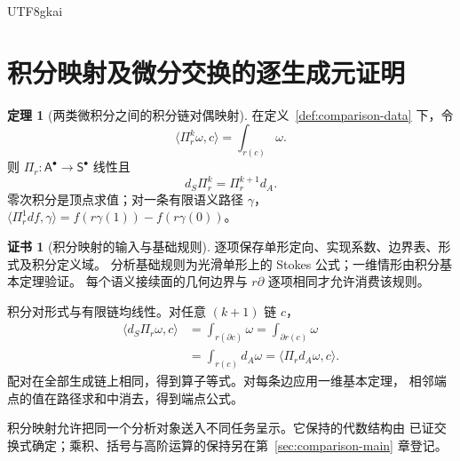\documentclass[12pt]{report}
\makeatletter
\theoremstyle{definition}
\newtheorem{theorem}{定理}[chapter]
\newtheorem{Certificate}{证书}[chapter]
\renewenvironment{proof}[1][\proofname]{\par
  \pushQED{\qed}\normalfont
  \topsep6\p@\@plus6\p@\relax
  \trivlist
  \item[\hskip\labelsep\normalfont #1\@addpunct{.}]\ignorespaces
}{
  \popQED\endtrivlist\@endpefalse
}
\makeatother
\begin{document}
\begin{CJK*}{UTF8}{gkai}
\section{积分映射及微分交换的逐生成元证明}
\begin{theorem}[两类微积分之间的积分链对偶映射]
\label{thm:comparison-integration}
在定义~\ref{def:comparison-data} 下，令
\[
\langle\Pi_r^k\omega,c\rangle=\int_{r(c)}\omega.
\]
则 \(\Pi_r:\mathsf A^\bullet\to\mathsf S^\bullet\) 线性且
\[
d_S\Pi_r^k=\Pi_r^{k+1}d_A.
\]
零次积分是顶点求值；对一条有限语义路径 \(\gamma\)，
\(\langle\Pi_r^1df,\gamma\rangle=f(r\gamma(1))-f(r\gamma(0))\)。
\end{theorem}
\begin{Certificate}[积分映射的输入与基础规则]
逐项保存单形定向、实现系数、边界表、形式及积分定义域。
分析基础规则为光滑单形上的 Stokes 公式；一维情形由积分基本定理验证。
每个语义接续面的几何边界与 \(r\partial\) 逐项相同才允许消费该规则。
\end{Certificate}
\begin{proof}
积分对形式与有限链均线性。对任意 \((k+1)\) 链 \(c\)，
\[
\begin{aligned}
\langle d_S\Pi_r\omega,c\rangle
&=\int_{r(\partial c)}\omega
=\int_{\partial r(c)}\omega\\
&=\int_{r(c)}d_A\omega
=\langle\Pi_r d_A\omega,c\rangle.
\end{aligned}
\]
配对在全部生成链上相同，得到算子等式。对每条边应用一维基本定理，
相邻端点的值在路径求和中消去，得到端点公式。
\end{proof}
积分映射允许把同一个分析对象送入不同任务呈示。它保持的代数结构由
已证交换式确定；乘积、括号与高阶运算的保持另在第~\ref{sec:comparison-main} 章登记。


\end{CJK*}
\end{document}
